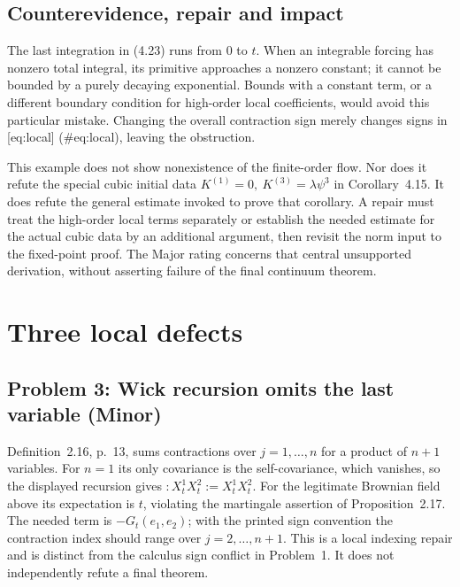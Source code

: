 \documentclass[10pt]{article}
\begin{document}
\subsection*{Counterevidence, repair and impact}
The last integration in (4.23) runs from \(0\) to \(t\). When an integrable forcing has nonzero total integral, its primitive approaches a nonzero constant; it cannot be bounded by a purely decaying exponential. Bounds with a constant term, or a different boundary condition for high-order local coefficients, would avoid this particular mistake. Changing the overall contraction sign merely changes signs in [eq:local] (\#eq:local), leaving the obstruction.\par
This example does not show nonexistence of the finite-order flow. Nor does it refute the special cubic initial data \(K^{(1)}=0,\ K^{(3)}=\lambda\psi^3\) in Corollary 4.15. It does refute the general estimate invoked to prove that corollary. A repair must treat the high-order local terms separately or establish the needed estimate for the actual cubic data by an additional argument, then revisit the norm input to the fixed-point proof. The Major rating concerns that central unsupported derivation, without asserting failure of the final continuum theorem.\par
\section*{Three local defects}
\subsection*{Problem 3: Wick recursion omits the last variable (Minor)}
Definition 2.16, p. 13, sums contractions over \(j=1,\ldots,n\) for a product of \(n+1\) variables. For \(n=1\) its only covariance is the self-covariance, which vanishes, so the displayed recursion gives \(:X_t^1X_t^2:=X_t^1X_t^2\). For the legitimate Brownian field above its expectation is \(t\), violating the martingale assertion of Proposition 2.17. The needed term is \(-G_t(e_1,e_2)\); with the printed sign convention the contraction index should range over \(j=2,\ldots,n+1\). This is a local indexing repair and is distinct from the calculus sign conflict in Problem 1. It does not independently refute a final theorem.\par
\end{document}
